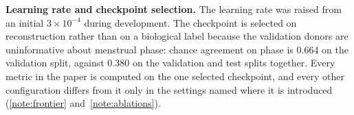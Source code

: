 \textbf{Learning rate and checkpoint selection.} The learning rate was
raised from an initial $3 \times 10^{-4}$ during development. The
checkpoint is selected on reconstruction rather than on a biological label
because the validation donors are uninformative about menstrual phase:
chance agreement on phase is 0.664 on the validation split, against 0.380
on the validation and test splits together. Every metric in the paper is
computed on the one selected checkpoint, and every other configuration
differs from it only in the settings named where it is introduced
(\ref{note:frontier} and~\ref{note:ablations}).

\begin{table}[t]
\centering
\caption[Hyperparameters]{\textbf{Every setting of the reported model.}
Generated from the training run's own recorded configuration and log. KL,
Kullback--Leibler divergence. The adversary's gradient is reversed and
scaled by $\lambda_{\mathrm{dab}}$ on its way to the encoder.}
\label{stab:hyperparameters}
\small

\end{table}
